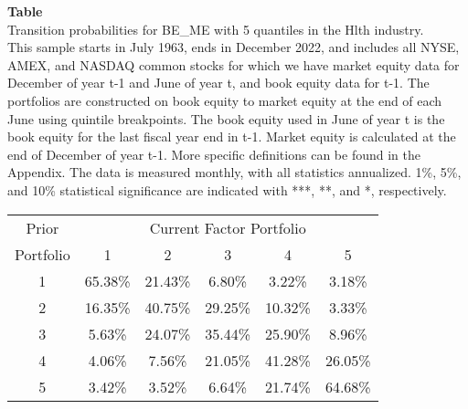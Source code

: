 \begin{table*}[ht!]
\raggedright
{}
\label{tab: transition_probs_BE_ME_Hlth_with_5_quantiles}
\textbf{Table \thetable} \\
Transition probabilities for BE_ME with 5 quantiles in the Hlth industry. \\
\hspace*{1em}This sample starts in July 1963, ends in December 2022, and includes all NYSE, AMEX, and NASDAQ common stocks for which we have market equity data for December of year t-1 and June of year t, and book equity data for t-1. The portfolios are constructed on book equity to market equity at the end of each June using quintile breakpoints.  The book equity used in June of year t is the book equity for the last fiscal year end in t-1.  Market equity is calculated at the end of December of year t-1.  More specific definitions can be found in the Appendix.  The data is measured monthly, with all statistics annualized.  1\%, 5\%, and 10\% statistical significance are indicated with ***, **, and *, respectively. \\
\vspace{0.5em}
\centering
\begin{adjustbox}{max width=\textwidth}
\begin{tabular}{@{}cccccc@{}}
\toprule
Prior & \multicolumn{5}{c}{Current Factor Portfolio} \\
Portfolio & 1 & 2 & 3 & 4 & 5 \\
\midrule
1 & 65.38\% & 21.43\% & 6.80\% & 3.22\% & 3.18\% \\
2 & 16.35\% & 40.75\% & 29.25\% & 10.32\% & 3.33\% \\
3 & 5.63\% & 24.07\% & 35.44\% & 25.90\% & 8.96\% \\
4 & 4.06\% & 7.56\% & 21.05\% & 41.28\% & 26.05\% \\
5 & 3.42\% & 3.52\% & 6.64\% & 21.74\% & 64.68\% \\
\bottomrule
\end{tabular}
\end{adjustbox}
\end{table*}